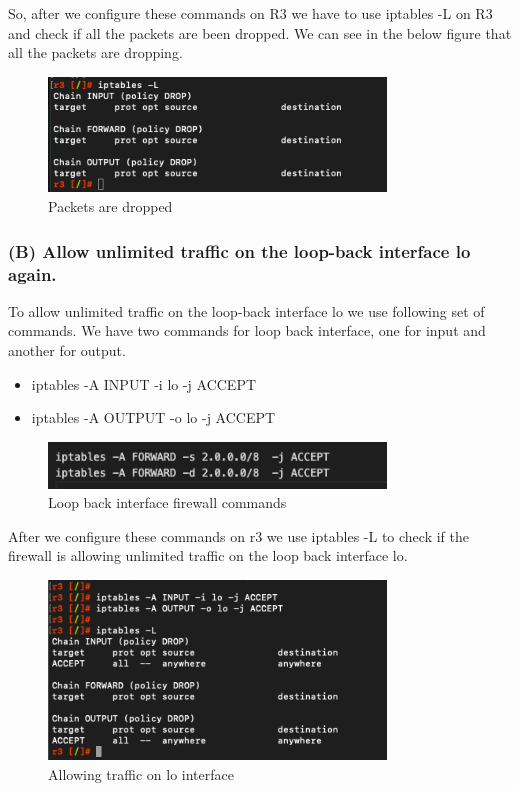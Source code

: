 So, after we configure these commands on R3 we have to use iptables -L on R3 and check if all the packets are been dropped.
We can see in the below figure that all the packets are dropping.
\begin{figure}[H]
\centering
  \includegraphics[width=0.8\textwidth]{Images/Packets dropped .png}
  \caption{Packets are dropped}
  \label{fig }
\end{figure}

\subsubsection{(B) Allow unlimited traffic on the loop-back interface lo again.}
To allow unlimited traffic on the loop-back interface lo we use following set of commands.
We have two commands for loop back interface, one for input and another for output.
\begin{itemize}
\item iptables -A INPUT -i lo -j ACCEPT
\item iptables -A OUTPUT -o lo -j ACCEPT
\end{itemize}

\begin{figure}[H]
\centering
  \includegraphics[width=0.8\textwidth]{Images/Loopback interface commands .png}
  \caption{Loop back interface firewall commands}
  \label{fig }
\end{figure}
After we configure these commands on r3 we use iptables -L to check if the firewall is allowing unlimited traffic on the loop back interface lo.
\begin{figure}[H]
\centering
  \includegraphics[width=0.8\textwidth]{Images/allowing Afterunlimited traffic on the loopback interface lo.png}
  \caption{Allowing traffic on lo interface}
  \label{fig }
\end{figure}

